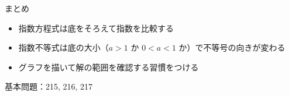 \documentclass[aspectratio=43,professionalfonts,handout]{beamer}
\begin{document}
\begin{frame}{まとめ}
  \begin{itemize}
    \item 指数方程式は底をそろえて指数を比較する
    \item 指数不等式は底の大小（$a > 1$ か $0 < a < 1$ か）で不等号の向きが変わる
    \item グラフを描いて解の範囲を確認する習慣をつける
  \end{itemize}

  \vfill
  {\small 基本問題：215, 216, 217}
\end{frame}
\end{document}

